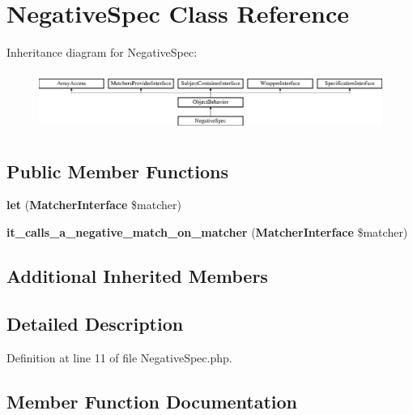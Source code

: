 \section{Negative\+Spec Class Reference}
\label{classspec_1_1_php_spec_1_1_wrapper_1_1_subject_1_1_expectation_1_1_negative_spec}
Inheritance diagram for Negative\+Spec\+:\begin{figure}[H]
\begin{center}
\leavevmode
\includegraphics[height=1.953488cm]{classspec_1_1_php_spec_1_1_wrapper_1_1_subject_1_1_expectation_1_1_negative_spec}
\end{center}
\end{figure}
\subsection*{Public Member Functions}
\begin{DoxyCompactItemize}
\item 
{\bf let} ({\bf Matcher\+Interface} \$matcher)
\item 
{\bf it\+\_\+calls\+\_\+a\+\_\+negative\+\_\+match\+\_\+on\+\_\+matcher} ({\bf Matcher\+Interface} \$matcher)
\end{DoxyCompactItemize}
\subsection*{Additional Inherited Members}


\subsection{Detailed Description}


Definition at line 11 of file Negative\+Spec.\+php.



\subsection{Member Function Documentation}
